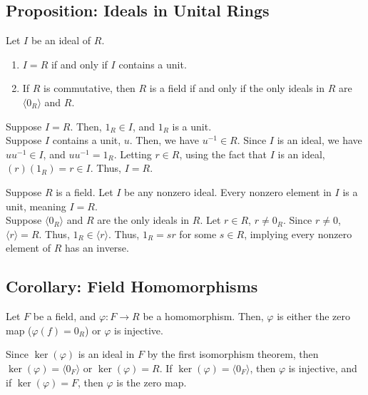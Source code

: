 \documentclass[8pt]{extarticle}
\begin{document}
  \subsection{Proposition: Ideals in Unital Rings}%
  Let $I$ be an ideal of $R$.
  \begin{enumerate}[(1)]
    \item $I = R$ if and only if $I$ contains a unit.
    \item If $R$ is commutative, then $R$ is a field if and only if the only ideals in $R$ are $\langle 0_R\rangle$ and $R$.
  \end{enumerate}
  \begin{description}[font=\normalfont]
    \item[Proof of (1):] Suppose $I = R$. Then, $1_R \in I$, and $1_R$ is a unit.\\

      Suppose $I$ contains a unit, $u$. Then, we have $u^{-1}\in R$. Since $I$ is an ideal, we have $uu^{-1} \in I$, and $uu^{-1} = 1_R$. Letting $r\in R$, using the fact that $I$ is an ideal, $(r)(1_R) = r\in I$. Thus, $I = R$.
    \item[Proof of (2):] Suppose $R$ is a field. Let $I$ be any nonzero ideal. Every nonzero element in $I$ is a unit, meaning $I = R$.\\

      Suppose $\langle 0_R\rangle$ and $R$ are the only ideals in $R$. Let $r \in R$, $r\neq 0_R$. Since $r\neq 0$, $\langle r \rangle = R$. Thus, $1_R \in \langle r \rangle$. Thus, $1_R = sr$ for some $s\in R$, implying every nonzero element of $R$ has an inverse.
  \end{description}
  \subsection{Corollary: Field Homomorphisms}%
  Let $F$ be a field, and $\varphi: F\rightarrow R$ be a homomorphism. Then, $\varphi$ is either the zero map ($\varphi(f) = 0_R$) or $\varphi$ is injective.
  \begin{description}[font=\normalfont]
    \item[Proof:] Since $\ker(\varphi)$ is an ideal in $F$ by the first isomorphism theorem, then $\ker(\varphi) = \langle 0_F\rangle$ or $\ker(\varphi) = R$. If $\ker(\varphi) = \langle 0_F\rangle$, then $\varphi$ is injective, and if $\ker(\varphi) = F$, then $\varphi$ is the zero map.
  \end{description}
\end{document}
